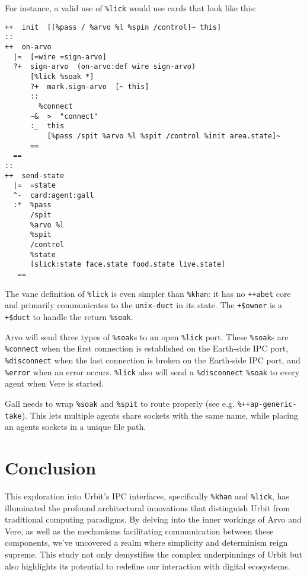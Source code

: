 \documentclass[twoside]{article}
\begin{document}
For instance, a valid use of \texttt{\%lick} would use cards that look like this:

\begin{verbatim}
++  init  [[%pass / %arvo %l %spin /control]~ this]
::
++  on-arvo
  |=  [=wire =sign-arvo]
  ?+  sign-arvo  (on-arvo:def wire sign-arvo)
      [%lick %soak *]
      ?+  mark.sign-arvo  [~ this]
      ::
        %connect
      ~&  >  "connect"
      :_  this  
          [%pass /spit %arvo %l %spit /control %init area.state]~
      ==  
  ==
::
++  send-state
  |=  =state
  ^-  card:agent:gall
  :*  %pass 
      /spit 
      %arvo %l 
      %spit 
      /control 
      %state 
      [slick:state face.state food.state live.state]
   ==
\end{verbatim}

The vane definition of \texttt{\%lick} is even simpler than \texttt{\%khan}:  it has no \texttt{++abet} core and primarily communicates to the \texttt{unix-duct} in its state.
The \texttt{+\$owner} is a \texttt{+\$duct} to handle the return \texttt{\%soak}.

Arvo will send three types of \texttt{\%soak}s to an open \texttt{\%lick} port. 
These \texttt{\%soak}s are \texttt{\%connect} when the first connection is established on the Earth-side IPC port,
\texttt{\%disconnect} when the last connection is broken on the Earth-side IPC port,
and \texttt{\%error} when an error occurs. 
\texttt{\%lick} also will send a \texttt{\%disconnect} \texttt{\%soak} to every agent when Vere is started.

Gall needs to wrap \texttt{\%soak} and \texttt{\%spit} to route properly (see e.g. \texttt{\%++ap-generic-take}). 
This lets multiple agents share sockets with the same name, while placing an agents sockets in a unique file path.

\section{Conclusion}

This exploration into Urbit's IPC interfaces, specifically \texttt{\%khan} and \texttt{\%lick}, has illuminated the profound architectural innovations that distinguish Urbit from traditional computing paradigms. 
By delving into the inner workings of Arvo and Vere, as well as the mechanisms facilitating communication between these components, we've uncovered a realm where simplicity and determinism reign supreme. 
This study not only demystifies the complex underpinnings of Urbit but also highlights its potential to redefine our interaction with digital ecosystems.
\end{document}
